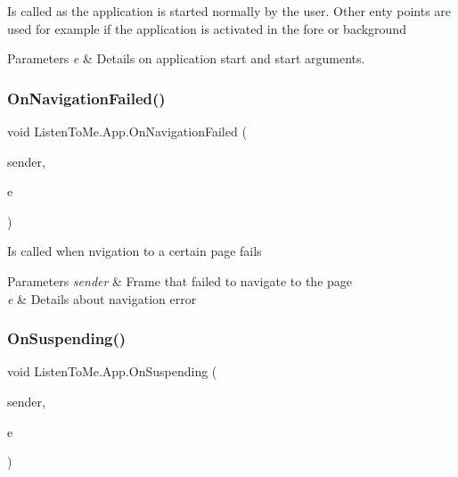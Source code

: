 Is called as the application is started normally by the user. Other enty points are used for example if the application is activated in the fore or background 


\begin{DoxyParams}{Parameters}
{\em e} & Details on application start and start arguments.\\
\hline
\end{DoxyParams}
\mbox{\label{class_listen_to_me_1_1_app_a8867647372e101bdd100a68eab4d0d3a}} 
\subsubsection{\texorpdfstring{On\+Navigation\+Failed()}{OnNavigationFailed()}}
{\footnotesize\ttfamily void Listen\+To\+Me.\+App.\+On\+Navigation\+Failed (\begin{DoxyParamCaption}\item[{object}]{sender,  }\item[{Navigation\+Failed\+Event\+Args}]{e }\end{DoxyParamCaption})\hspace{0.3cm}{\ttfamily [private]}}



Is called when nvigation to a certain page fails 


\begin{DoxyParams}{Parameters}
{\em sender} & Frame that failed to navigate to the page\\
\hline
{\em e} & Details about navigation error\\
\hline
\end{DoxyParams}
\mbox{\label{class_listen_to_me_1_1_app_adc9d18402a7a696ca6d4a7631a610e8d}} 
\subsubsection{\texorpdfstring{On\+Suspending()}{OnSuspending()}}
{\footnotesize\ttfamily void Listen\+To\+Me.\+App.\+On\+Suspending (\begin{DoxyParamCaption}\item[{object}]{sender,  }\item[{Suspending\+Event\+Args}]{e }\end{DoxyParamCaption})\hspace{0.3cm}{\ttfamily [private]}}



